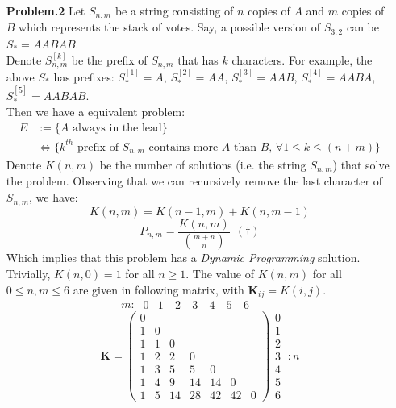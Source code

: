 \documentclass[a4paper, 11pt]{article}
\begin{document}
\begin{itemize}
	\item[\textbf{Problem.2}] Let $S_{n,m}$ be a string consisting of $n$ copies of $A$ and $m$ copies of $B$ which represents the stack of votes. Say, a possible version of $S_{3,2}$ can be $S_*=AABAB$.\\
	Denote $S^{[k]}_{n,m}$ be the prefix of $S_{n,m}$ that has $k$ characters. For example, the above $S_{*}$ has prefixes: $S_*^{[1]}=A$, $S_*^{[2]}=AA$, $S_*^{[3]}=AAB$, $S_*^{[4]}=AABA$, $S_*^{[5]}=AABAB$.\\
	Then we have a equivalent problem:
	\begin{equation}
		\begin{split}
			E &:= \{\text{$A$ always in the lead}\} \\
			&\iff \{\text{$k^{th}$ prefix of $S_{n,m}$ contains more $A$ than $B$, $\forall 1\leq k \leq (n+m)$}\}
		\end{split}
	\end{equation}
	Denote $K(n,m)$ be the number of solutions (i.e. the string $S_{n,m}$) that solve the problem. Observing that we can recursively remove the last character of $S_{n,m}$, we have:
	$$K(n,m)=K(n-1, m)+K(n,m-1)$$
	$$P_{n,m}=\frac{K(n,m)}{\binom{m+n}{n}}~~(\dagger)$$
	Which implies that this problem has a \textit{Dynamic Programming} solution. Trivially, $K(n,0)=1$ for all $n\geq 1$. The value of $K(n,m)$ for all $0\leq n,m\leq 6$ are given in following matrix, with $\bm{K}_{ij}=K(i,j)$.
	$$m:~\begin{array}{ccccccc}0 & 1 & ~2 & ~3 & ~4 & ~5 & ~6\end{array}~~~~~~~~~~$$
	$$
	\bm{K}=\left( \begin{array}{ccccccc}
	0 &  &  &  &  &  &\\
	1 & 0 &  &  &  &  &\\
	1 & 1 & 0 &  &  &  &\\
	1 & 2 & 2 & 0 &  &  &\\
	1 & 3 & 5 & 5 & 0 &  &\\
	1 & 4 & 9 & 14 & 14 & 0 &\\
	1 & 5 & 14 & 28 & 42 & 42 & 0\end{array} \right)
	\begin{array}{c}
	0\\
	1\\
	2\\
	3\\
	4\\
	5\\
	6
	\end{array}~:n
$$
\end{itemize}
\end{document}
